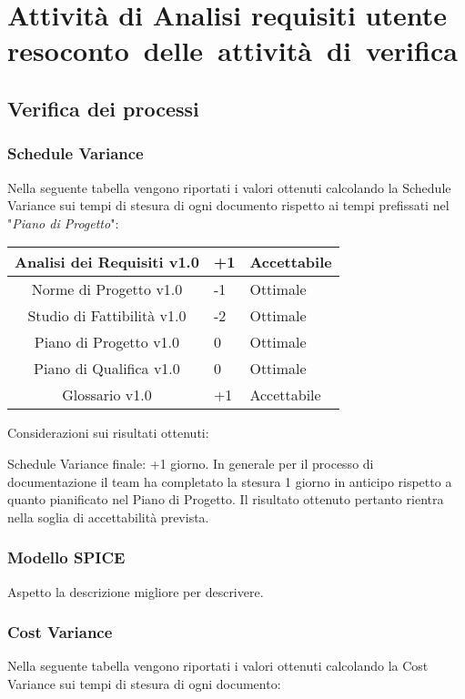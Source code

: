 \newpage
\section{Attività di Analisi requisiti utente \\\large{resoconto~delle~attività~di~verifica}}
\subsection{Verifica dei processi}
\subsubsection{Schedule Variance}
Nella seguente tabella vengono riportati i valori ottenuti calcolando la Schedule Variance sui tempi di stesura di ogni documento rispetto ai tempi prefissati nel "\textit{Piano di Progetto}":

{
	\centering
	\begin{tabular}{| c | R{0.5cm} | C{3cm} |}
	\hline
	Analisi dei Requisiti v1.0 & +1 & Accettabile \\
	\hline
	Norme di Progetto v1.0 & -1 & Ottimale \\
	\hline
	Studio di Fattibilità v1.0 &  -2 &  Ottimale \\
	\hline
	Piano di Progetto v1.0 &  0 &  Ottimale\\
	\hline
	Piano di Qualifica v1.0 & 0 & Ottimale \\
	\hline
	Glossario v1.0 & +1 & Accettabile\\	
	\hline
	\end{tabular}

}

Considerazioni sui risultati ottenuti:

Schedule Variance finale: +1 giorno.
In generale per il processo di documentazione il team ha completato la stesura 1 giorno in anticipo rispetto a quanto pianificato nel Piano di Progetto. Il risultato ottenuto pertanto rientra nella soglia di accettabilità prevista.

\subsubsection{Modello SPICE}
Aspetto la descrizione migliore per descrivere.

\subsubsection{Cost Variance}
Nella seguente tabella vengono riportati i valori ottenuti calcolando la Cost Variance sui tempi di stesura di ogni documento:

